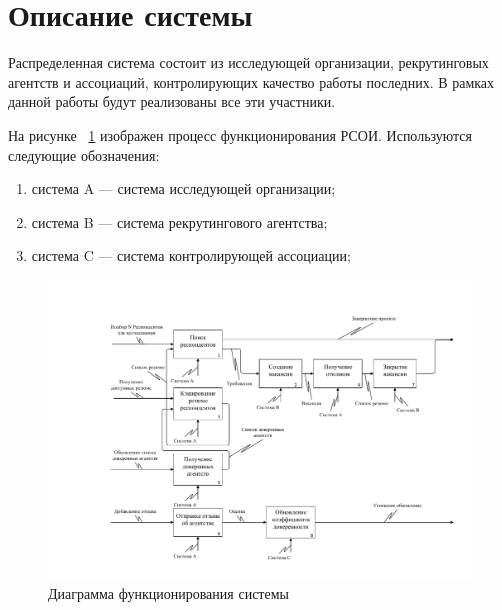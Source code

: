 \section{Описание системы}
Распределенная система состоит из  исследующей организации, рекрутинговых агентств и ассоциаций, контролирующих качество работы последних. В рамках данной работы будут реализованы все эти участники.

На рисунке ~\ref{fig:idef0} изображен процесс функционирования РСОИ. Используются следующие обозначения:
\begin{enumerate}
\item система A — система исследующей организации;
\item система B — система рекрутингового агентства; 
\item система C — система контролирующей ассоциации;
\end{enumerate}

\begin{figure}[ht]
  \centering
  \includegraphics[width=\textwidth]{include/idef0.pdf}
  \caption{Диаграмма функционирования системы}
  \label{fig:idef0}
\end{figure}

